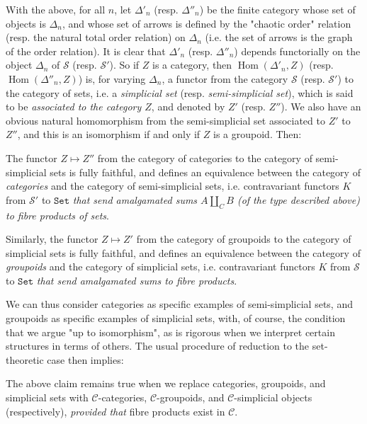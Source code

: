 With the above, for all $n$, let $\Delta'_n$ (resp. $\Delta''_n$) be the finite category whose set of objects is $\Delta_n$, and whose set of arrows is defined by the "chaotic order" relation (resp. the natural total order relation) on $\Delta_n$ (i.e. the set of arrows is the graph of the order relation).
It is clear that $\Delta'_n$ (resp. $\Delta''_n$) depends functorially on the object $\Delta_n$ of $\mathcal{S}$ (resp. $\mathcal{S}'$).
So if $Z$ is a category, then $\operatorname{Hom}(\Delta'_n,Z)$ (resp. $\operatorname{Hom}(\Delta''_n,Z)$) is, for varying $\Delta_n$, a functor from the category $\mathcal{S}$ (resp. $\mathcal{S}'$) to the category of sets, i.e. a \emph{simplicial set} (resp. \emph{semi-simplicial set}), which is said to be \emph{associated to the category $Z$}, and denoted by $Z'$ (resp. $Z''$).
We also have an obvious natural homomorphism from the semi-simplicial set associated to $Z'$ to $Z''$, and this is an isomorphism if and only if $Z$ is a groupoid.
Then:

\begin{proposition}\label{fga3.iii-4-proposition-4.1}
    The functor $Z\mapsto Z''$ from the category of categories to the category of semi-simplicial sets is fully faithful, and defines an equivalence between the category of \emph{categories} and the category of semi-simplicial sets, i.e. contravariant functors $K$ from $\mathcal{S}'$ to $\mathtt{Set}$ \emph{that send amalgamated sums $A\coprod_C B$ (of the type described above) to fibre products of sets}.

    Similarly, the functor $Z\mapsto Z'$ from the category of groupoids to the category of simplicial sets is fully faithful, and defines an equivalence between the category of \emph{groupoids} and the category of simplicial sets, i.e. contravariant functors $K$ from $\mathcal{S}$ to $\mathtt{Set}$ \emph{that send amalgamated sums to fibre products}.
\end{proposition}


We can thus consider categories as specific examples of semi-simplicial sets, and groupoids as specific examples of simplicial sets, with, of course, the condition that we argue "up to isomorphism", as is rigorous when we interpret certain structures in terms of others.
The usual procedure of reduction to the set-theoretic case then implies:


\begin{corollary}\label{fga3.iii-4-corollary-4.2}
    The above claim remains true when we replace categories, groupoids, and simplicial sets with $\mathcal{C}$-categories, $\mathcal{C}$-groupoids, and $\mathcal{C}$-simplicial objects (respectively), \emph{provided that} fibre products exist in $\mathcal{C}$.
\end{corollary}



